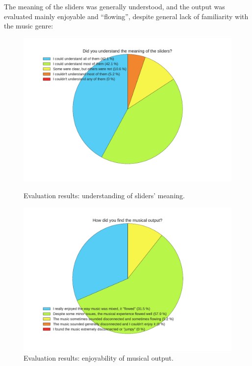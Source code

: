 The meaning of the sliders was generally understood, and the output was evaluated mainly enjoyable and ``flowing'', despite general lack of familiarity with the music genre:\\
\begin{figure}[h]
\begin{center}
\includegraphics[scale=0.67]{Figures/slidersmeaning.pdf}
  \caption[Evaluation results: understanding of sliders' meaning]{Evaluation results: understanding of sliders' meaning.}
\includegraphics[scale=0.67]{Figures/flow.pdf}
  \caption[Evaluation results: enjoyability of musical output]{Evaluation results: enjoyability of musical output.}
\end{center}
\end{figure}

